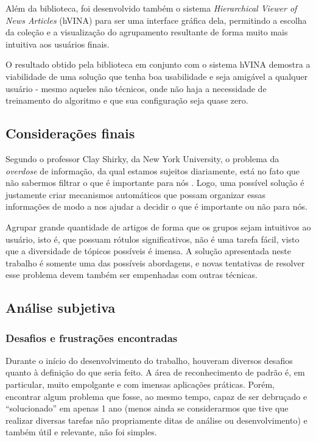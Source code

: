 \documentclass[a4paper,12pt]{article}
\begin{document}
Além da biblioteca, foi desenvolvido também o sistema \textit{Hierarchical Viewer of News Articles} (hVINA) para ser uma interface gráfica dela, permitindo a escolha da coleção e a visualização do agrupamento resultante de forma muito mais intuitiva aos usuários finais.

O resultado obtido pela biblioteca em conjunto com o sistema hVINA demostra a viabilidade de uma solução que tenha boa usabilidade e seja amigável a qualquer usuário - mesmo aqueles não técnicos, onde não haja a necessidade de treinamento do algoritmo e que sua configuração seja quase zero.

\subsection {Considerações finais}
\label {sec:consideracoes_finais}

Segundo o professor Clay Shirky, da New York University, o problema da \textit{overdose} de informação, da qual estamos sujeitos diariamente, está no fato que não sabermos filtrar o que é importante para nós \cite{shirky}. Logo, uma possível solução é justamente criar mecanismos automáticos que possam organizar essas informações de modo a nos ajudar a decidir o que é importante ou não para nós.

Agrupar grande quantidade de artigos de forma que os grupos sejam intuitivos ao usuário, isto é, que possuam rótulos significativos, não é uma tarefa fácil, visto que a diversidade de tópicos possíveis é imensa. A solução apresentada neste trabalho é somente uma das possíveis abordagens, e novas tentativas de resolver esse problema devem também ser empenhadas com outras técnicas.

\subsection {Análise subjetiva}
\label {sec:analise_subjetiva}

\subsubsection {Desafios e frustrações encontradas}
\label {sec:desafios_frustracoes_encontradas}

Durante o início do desenvolvimento do trabalho, houveram diversos desafios quanto à definição do que seria feito. A área de reconhecimento de padrão é, em particular, muito empolgante e com imensas aplicações práticas. Porém, encontrar algum problema que fosse, ao mesmo tempo, capaz de ser debruçado e “solucionado” em apenas 1 ano (menos ainda se considerarmos que tive que realizar diversas tarefas não propriamente ditas de análise ou desenvolvimento) e também útil e relevante, não foi simples.
\end{document}
